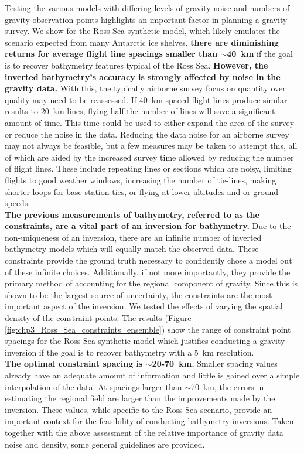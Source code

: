 Testing the various models with differing levels of gravity noise and numbers of gravity observation points highlights an important factor in planning a gravity survey. We show for the Ross Sea synthetic model, which likely emulates the scenario expected from many Antarctic ice shelves, \textbf{there are diminishing returns for average flight line spacings smaller than $\sim$40~km} if the goal is to recover bathymetry features typical of the Ross Sea. \textbf{However, the inverted bathymetry's accuracy is strongly affected by noise in the gravity data.} With this, the typically airborne survey focus on quantity over quality may need to be reassessed. If 40~km spaced flight lines produce similar results to 20~km lines, flying half the number of lines will save a significant amount of time. This time could be used to either expand the area of the survey or reduce the noise in the data. Reducing the data noise for an airborne survey may not always be feasible, but a few measures may be taken to attempt this, all of which are aided by the increased survey time allowed by reducing the number of flight lines. These include repeating lines or sections which are noisy, limiting flights to good weather windows, increasing the number of tie-lines, making shorter loops for base-station ties, or flying at lower altitudes and or ground speeds.  \\

\textbf{The previous measurements of bathymetry, referred to as the constraints, are a vital part of an inversion for bathymetry.} Due to the non-uniqueness of an inversion, there are an infinite number of inverted bathymetry models which will equally match the observed data. These constraints provide the ground truth necessary to confidently chose a model out of these infinite choices. Additionally, if not more importantly, they provide the primary method of accounting for the regional component of gravity. Since this is shown to be the largest source of uncertainty, the constraints are the most important aspect of the inversion. We tested the effects of varying the spatial density of the constraint points. The results (Figure \ref{fig:chp3_Ross_Sea_constraints_ensemble}) show the range of constraint point spacings for the Ross Sea synthetic model which justifies conducting a gravity inversion if the goal is to recover bathymetry with a 5~km resolution. \\

\textbf{The optimal constraint spacing is $\sim$20-70~km.} Smaller spacing values already have an adequate amount of information and little is gained over a simple interpolation of the data. At spacings larger than $\sim$70~km, the errors in estimating the regional field are larger than the improvements made by the inversion. These values, while specific to the Ross Sea scenario, provide an important context for the feasibility of conducting bathymetry inversions. Taken together with the above assessment of the relative importance of gravity data noise and density, some general guidelines are provided. \\

